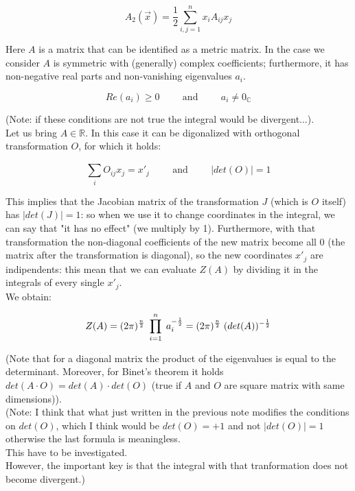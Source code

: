 \documentclass[12pt, english, a4paper]{book}
\begin{document}
\begin{equation}
A_2(\vec{x}) = \frac{1}{2} \sum\limits_{i,j = 1}^{n} x_i A_{ij} x_j
\end{equation}

Here $A$ is a matrix that can be identified as a metric matrix.
In the case we consider $A$ is symmetric with (generally) complex coefficients; furthermore, it has non-negative real parts and non-vanishing eigenvalues $a_i$.

$$ Re(a_i) \geq 0 \hspace{1cm} \mathrm{and} \hspace{1cm}  a_i \neq 0_{\mathbb{C}} $$

(Note: if these conditions are not true the integral would be divergent...).\\

Let us bring $A \in \mathbb{R}$. In this case it can be digonalized with orthogonal transformation $O$, for which it holds:

$$ \sum\limits_{i}^{} O_{ij} x_j = x'_j \hspace{1cm} \mathrm{and} \hspace{1cm} |det(O)| = 1 $$

This implies that the Jacobian matrix of the transformation $J$ (which is $O$ itself) has $|det(J)| = 1$: so when we use it to change coordinates in the integral, we can say that "it has no effect" (we multiply by 1).
Furthermore, with that transformation the non-diagonal coefficients of the new matrix become all 0 (the matrix after the transformation is diagonal), so the new coordinates $x'_j$ are indipendents: this mean that we can evaluate $Z(A)$ by dividing it in the integrals of every single $x'_j$.\\
We obtain:

\begin{equation}
Z(A) = (2\pi)^{ \frac{n}{2} } \hspace{1mm} \prod\limits_{i=1}^{n} \hspace{1mm} a_i^{ -\frac{1}{2} } = (2\pi)^{ \frac{n}{2} } \hspace{1mm} (det(A))^{ -\frac{1}{2} }
\end{equation}

(Note that for a diagonal matrix the product of the eigenvalues is equal to the determinant. Moreover, for Binet's theorem it holds $det(A \cdot O) = det(A) \cdot det(O)$ (true if $A$ and $O$ are square matrix with same dimensions)).\\
(Note: I think that what just written in the previous note modifies the conditions on $det(O)$, which I think would be $det(O) = +1$ and not $|det(O)| = 1 $ otherwise the last formula is meaningless.\\
This have to be investigated.\\
However, the important key is that the integral with that tranformation does not become divergent.)
\end{document}
